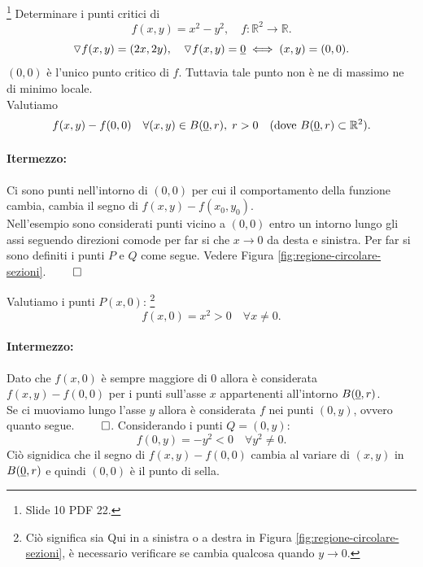 \begin{example}
	\footnote{Slide 10 PDF 22.}
	Determinare i punti critici di
	\begin{equation*}
		f(x,y) = x^2 - y^2,\quad f:\mathbb{R}^2\rightarrow\mathbb{R}.
	\end{equation*}
	\begin{equation*}
		\triangledown f(x,y) = (2x, 2y), \quad \triangledown f(x,y) = \uline{0} \iff (x,y)=(0,0).
	\end{equation*}
	$(0,0)$ è l'unico punto critico di $f$. Tuttavia tale punto non è ne di massimo ne di minimo locale.\\
	Valutiamo
	\begin{equation*}
		f(x,y) - f(0,0)\quad \forall(x,y)\in B(\uline 0, r),\; r>0 \quad \text{(dove }B(\uline 0, r)\subset\mathbb{R}^2).
	\end{equation*}
	\paragraph{Itermezzo:} Ci sono punti nell'intorno di $(0,0)$ per cui il comportamento della funzione cambia, cambia il segno di $f(x,y) - f(x_0, y_0)$.\\
	Nell'esempio sono considerati punti vicino a $(0,0)$ entro un intorno lungo gli assi seguendo direzioni comode per far si che $x\rightarrow 0$ da desta e sinistra. Per far si sono definiti i punti $P$ e $Q$ come segue. Vedere Figura \ref{fig:regione-circolare-sezioni}. $\qed$
	
	Valutiamo i punti $P(x,0)$: \footnote{Ciò significa sia \textcolor{green!65!black}{Qui} in a sinistra o a destra in Figura \ref{fig:regione-circolare-sezioni}, è necessario verificare se cambia qualcosa quando $y\rightarrow 0$.}
	\begin{equation*}
		f(x,0)=x^2 > 0\quad \forall x\neq 0.
	\end{equation*}
	\paragraph{Intermezzo:} Dato che $f(x,0)$ è sempre maggiore di 0 allora è considerata $f(x,y) - f(0,0)$ per i punti sull'asse $x$ appartenenti all'intorno $B(\uline 0, r)$.\\
	Se ci muoviamo lungo l'asse $y$ allora è considerata $f$ nei punti $(0,y)$, ovvero quanto segue. $\qed$.
	Considerando i punti $Q=(0,y)$:
	\begin{equation*}
		f(0,y) = -y^2 < 0\quad\forall y^2\neq 0.
	\end{equation*}
	Ciò signidica che il segno di $f(x,y) - f(0,0)$ cambia al variare di $(x,y)$ in $B(\uline 0, r)$ e quindi $(0,0)$ è il punto di sella.
		\begin{figure}[ht]
		\centering
\end{figure}
\end{example}
